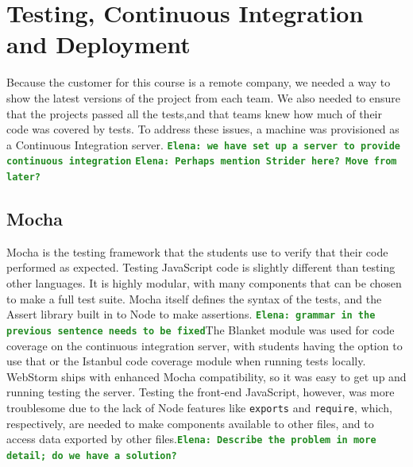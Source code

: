 \documentclass[12pt]{article}
\newcommand{\comment}[1]{{\bf \tt  {#1}}}
\newcommand{\emcomment}[1]{\textcolor{ForestGreen}{\comment{Elena: {#1}}}}
\newcommand{\code}[1]{{\texttt {#1}}}
\begin{document}

\section{Testing, Continuous Integration and Deployment}\label{sec:CI}
Because the customer for this course is a remote company, we needed a way to show the latest versions of the project from each team. We also needed to ensure that the projects passed all the tests,and that teams knew how much of their code was covered by tests. To address these issues, a machine was provisioned as a Continuous Integration server. \emcomment{we have set up a server to provide continuous integration} \emcomment{Perhaps mention Strider here? Move from later?}

\subsection{Mocha}\label{sec:mocha}
Mocha is the testing framework that the students use to verify that their code performed as expected. Testing JavaScript code is slightly different than testing other languages. It is highly modular, with many components that can be chosen to make a full test suite. Mocha itself defines the syntax of the tests, and the Assert library built in to Node to make assertions. \emcomment{grammar in the previous sentence needs to be fixed}The Blanket module was used for code coverage on the continuous integration server, with students having the option to use that or the Istanbul code coverage module when running tests locally. WebStorm ships with enhanced Mocha compatibility, so it was easy to get up and running testing the server. Testing the front-end JavaScript, however, was more troublesome due to the lack of Node features like \code{exports} and \code{require}, which, respectively, are needed to make components available to other files, and to access data exported by other files.\emcomment{Describe the problem in more detail; do we have a solution?}
\end{document}
